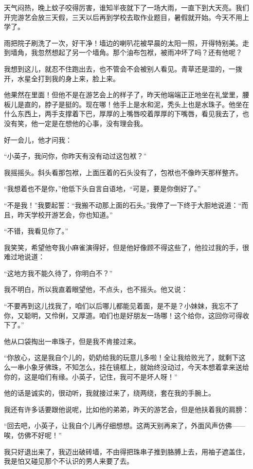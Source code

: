 \par 天气闷热，晚上蚊子咬得厉害，谁知半夜就下了一场大雨，一直下到大天亮。我们开完游艺会放三天假，三天以后再到学校去取作业题目，暑假就开始。今天不用上学了。
\par 雨把院子刷洗了一次，好干净！墙边的喇叭花被早晨的太阳一照，开得特别美。走到墙角，我忽然想起了另一个墙角。那个油布包袱，被雨冲坏了吗？还有他呢？
\par 我想到这儿，就忍不住跑出去，也不管会不会被别人看见。青草还是湿的，一拨开，水星全打到我的身上来，脸上来。
\par 他果然在里面！但他不是在游艺会上的样子了，昨天他端端正正地坐在礼堂里，腰板儿是直的，脖子是挺的。现在哪！他手上是水和泥，秃头上也是水珠子。他坐在什么东西上，两手支撑着下巴，厚厚的上嘴唇咬着厚厚的下嘴唇，看见我去了，也没有笑，他一定是在想他的心事，没有理会我。
\par 好一会儿，他才问我：
\par “小英子，我问你，你昨天有没有动过这包袱？”
\par 我摇摇头。斜头看那包袱，上面压着的石头没有了，包袱也不像昨天那样整齐。
\par “我想着也不是你，”他低下头自言自语地，“可是，要是你倒好了。”
\par “不是我！”我要起誓：“我搬不动那上面的石头。”我停了一下终于大胆地说道：“而且，昨天学校开游艺会，你也知道。”
\par “不错，我看见你了。”
\par 我笑笑，希望他夸我小麻雀演得好，但是他好像顾不得这些了，他拉过我的手，很难过地说道：
\par “这地方我不能久待了，你明白不？”
\par 我不明白，所以我直着眼望他，不点头，也不摇头。他又说：
\par “不要再到这儿找我了，咱们以后哪儿都能见着面，是不是？小妹妹，我忘不了你，又聪明，又伶俐，又厚道。咱们也是好朋友一场哪！这个给你，这回你可得收下了。”
\par 他从口袋掏出一串珠子，但是我不肯接过来。
\par “你放心，这是我自个儿的，奶奶给我的玩意儿多啦！全让我给败光了，就剩下这么一串小象牙佛珠，不知怎么，挂在镜框上，就始终没动过，今天本想着拿来送给你的，这是咱们有缘。小英子，记住，我可不是坏人呀！”
\par 他的话是诚实的，很动听，我就接过来了，绕两绕，套在我的手腕上。
\par 我还有许多话要跟他说呢，比如他的弟弟，昨天的游艺会，但是他扶着我的肩膀：
\par “回去吧，小英子，让我自个儿再仔细想想。这两天别再来了，外面风声仿佛——唉，仿佛不好呢！”
\par 我只好退出来了，我迈出破砖墙，不由得把珠串子推到胳膊上去，用袖子遮盖住，我是怕又碰见那个不认识的男人来要了去。

